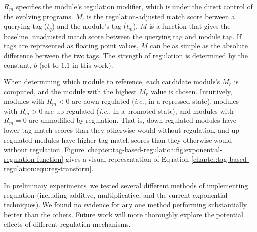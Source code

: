 \noindent
$R_m$ specifies the module's regulation modifier, which is under the direct control of the evolving programs.
$M_r$ is the regulation-adjusted match score between a querying tag ($t_q$) and the module's tag ($t_m$).
$M$ is a function that gives the baseline, unadjusted match score between the querying tag and module tag.
If tags are represented as floating point values, $M$ can be as simple as the absolute difference between the two tags.
The strength of regulation is determined by the constant, $b$ (set to $1.1$ in this work). 



When determining which module to reference, each candidate module's $M_r$ is computed, and the module with the highest $M_r$ value is chosen. 
Intuitively, modules with $R_m < 0$ are down-regulated (\textit{i.e.}, in a repressed state), modules with $R_m > 0$ are up-regulated (\textit{i.e.}, in a promoted state), and modules with $R_m = 0$ are unmodified by regulation. 
That is, down-regulated modules have lower tag-match scores than they otherwise would without regulation, and up-regulated modules have higher tag-match scores than they otherwise would without regulation.
Figure \ref{chapter:tag-based-regulation:fig:exponential-regulation-function} gives a visual representation of Equation \ref{chapter:tag-based-regulation:equ:reg-transform}.

In preliminary experiments, we tested several different methods of implementing regulation (including additive, multiplicative, and the current exponential techniques).
We found no evidence for any one method performing substantially better than the others.
Future work will more thoroughly explore the potential effects of different regulation mechanisms. 







